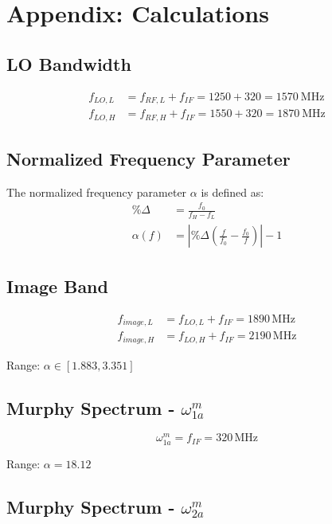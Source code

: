 \newpage
\section{Appendix: Calculations}

\subsection{LO Bandwidth}
\label{eq:LO}
\begin{align*}
    f_{LO,L} &= f_{RF,L} + f_{IF} = 1250 + 320 = 1570 \mathrm{~MHz} \\
    f_{LO,H} &= f_{RF,H} + f_{IF} = 1550 + 320 = 1870 \mathrm{~MHz}
\end{align*}

\subsection{Normalized Frequency Parameter}

The normalized frequency parameter $\alpha$ is defined as:
\begin{align}
    \%\Delta &= \frac{f_{0}}{f_{H}-f_{L}} \\
    \alpha(f)&=\left| \%\Delta \left( \frac{f}{f_{0}}-\frac{f_{0}}{f} \right) \right| - 1
\end{align}

\subsection{Image Band}
\label{eq:image-derivation}

\begin{align}
f_{image,L} &= f_{LO,L} + f_{IF} = 1890\,\text{MHz} \\
f_{image,H} &= f_{LO,H} + f_{IF} = 2190\,\text{MHz}
\end{align}

Range: $\alpha \in [1.883, 3.351]$

\subsection{Murphy Spectrum - $\omega_{1a}^m$}
\label{eq:1a}

\begin{equation}
\omega_{1a}^m = f_{IF} = 320\,\text{MHz}
\end{equation}

Range: $\alpha = 18.12$

\subsection{Murphy Spectrum - $\omega_{2a}^m$}
\label{eq:2a}

